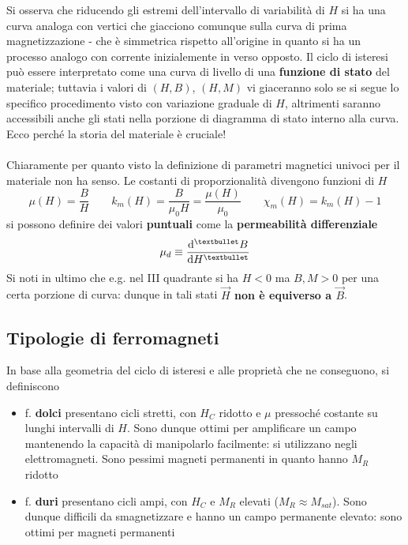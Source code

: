 Si osserva che riducendo gli estremi dell'intervallo di variabilità di $H$ si ha una curva analoga con vertici che giacciono comunque sulla curva di prima magnetizzazione - che è simmetrica rispetto all'origine in quanto si ha un processo analogo con corrente inizialemente in verso opposto. Il ciclo di isteresi può essere interpretato come una curva di livello di una \textbf{funzione di stato} del materiale; tuttavia i valori di $(H,B)$, $(H,M)$ vi giaceranno solo se si segue lo specifico procedimento visto con variazione graduale di $H$, altrimenti saranno accessibili anche gli stati nella porzione di diagramma di stato interno alla curva. Ecco perché la storia del materiale è cruciale!
\\~\\
Chiaramente per quanto visto la definizione di parametri magnetici univoci per il materiale non ha senso. Le costanti di proporzionalità divengono funzioni di $H$
\[\mu(H) = \frac{B}{H} \qquad k_m(H) = \frac{B}{\mu_0 H} = \frac{\mu(H)}{\mu_0} \qquad \chi_m(H) = k_m(H) - 1\]
si possono definire dei valori \textbf{puntuali} come la \textbf{permeabilità differenziale}
\[\mu_d \equiv \dv[•]{B}{H}\]
Si noti in ultimo che e.g. nel III quadrante si ha $H < 0$ ma $B, M > 0$ per una certa porzione di curva: dunque in tali stati \textbf{$\vec{H}$ non è equiverso a $\vec{B}$}.

\subsection{Tipologie di ferromagneti}
In base alla geometria del ciclo di isteresi e alle proprietà che ne conseguono, si definiscono
\begin{itemize}
\item f. \textbf{dolci} presentano cicli stretti, con $H_C$ ridotto e $\mu$ pressoché costante su lunghi intervalli di $H$. Sono dunque ottimi per amplificare un campo mantenendo la capacità di manipolarlo facilmente: si utilizzano negli elettromagneti. Sono pessimi magneti permanenti in quanto hanno $M_R$ ridotto
\item f. \textbf{duri} presentano cicli ampi, con $H_C$ e $M_R$ elevati ($M_R \approx M_{sat}$). Sono dunque difficili da smagnetizzare e hanno un campo permanente elevato: sono ottimi per magneti permanenti
\end{itemize}

